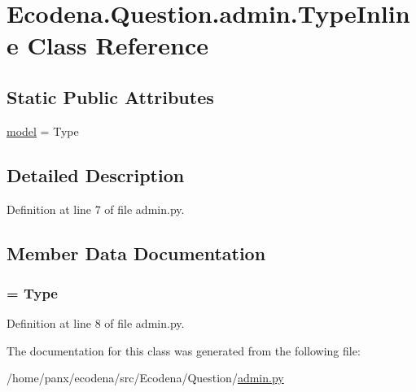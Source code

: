 \hypertarget{class_ecodena_1_1_question_1_1admin_1_1_type_inline}{
\section{Ecodena.Question.admin.TypeInline Class Reference}
\label{d3/d63/class_ecodena_1_1_question_1_1admin_1_1_type_inline}
}
\subsection*{Static Public Attributes}
\begin{DoxyCompactItemize}
\item 
\hyperlink{class_ecodena_1_1_question_1_1admin_1_1_type_inline_a42c0b72c2db4811c6ded79a88ea0418a}{model} = Type
\end{DoxyCompactItemize}


\subsection{Detailed Description}


Definition at line 7 of file admin.py.



\subsection{Member Data Documentation}
\hypertarget{class_ecodena_1_1_question_1_1admin_1_1_type_inline_a42c0b72c2db4811c6ded79a88ea0418a}{
\subsubsection[{model}]{ = Type}}
\label{d3/d63/class_ecodena_1_1_question_1_1admin_1_1_type_inline_a42c0b72c2db4811c6ded79a88ea0418a}


Definition at line 8 of file admin.py.



The documentation for this class was generated from the following file:\begin{DoxyCompactItemize}
\item 
/home/panx/ecodena/src/Ecodena/Question/\hyperlink{_question_2admin_8py}{admin.py}\end{DoxyCompactItemize}
